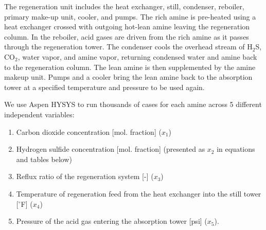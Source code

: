 \documentclass[11pt]{report}
\begin{document}
The regeneration unit includes the heat exchanger, still, condenser, reboiler, primary make-up unit, cooler, and pumps.   The rich amine is pre-heated using a heat exchanger crossed with outgoing hot-lean amine leaving the regeneration column. In the reboiler, acid gases are driven from the rich amine as it passes through the regeneration tower. The condenser cools the overhead stream of H$_2$S, CO$_2$, water vapor, and amine vapor, returning condensed water and amine back to the regeneration column. The lean amine is then supplemented by the amine makeup unit. Pumps and a cooler bring the lean amine back to the absorption tower at a specified temperature and pressure to be used again.  

We use Aspen HYSYS to run thousands of cases for each amine across 5 different independent variables: 
\begin{enumerate}
\item Carbon dioxide concentration [mol. fraction] ($x_1$)
\item Hydrogen sulfide concentration [mol. fraction] (presented as $x_2$ in equations and tables below)
\item Reflux ratio of the regeneration system [-] ($x_3$)
\item Temperature of regeneration feed from the heat exchanger into the still tower [$^\circ$F] ($x_4$)
\item Pressure of the acid gas entering the absorption tower [psi] ($x_5$).
\end{enumerate}
\end{document}
